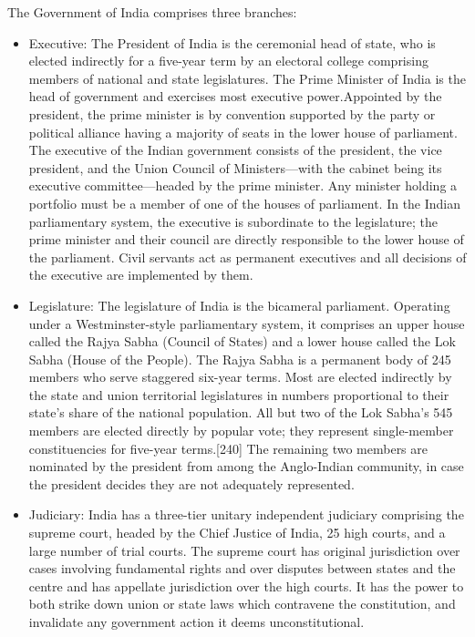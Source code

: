 \documentclass[12pt,a4paper]{article}
\begin{document}
The Government of India comprises three branches:
\begin{itemize}
	\item Executive: The President of India is the ceremonial head of state, who is elected indirectly for a five-year term by an electoral college comprising members of national and state legislatures. The Prime Minister of India is the head of government and exercises most executive power.Appointed by the president, the prime minister is by convention supported by the party or political alliance having a majority of seats in the lower house of parliament. The executive of the Indian government consists of the president, the vice president, and the Union Council of Ministers—with the cabinet being its executive committee—headed by the prime minister. Any minister holding a portfolio must be a member of one of the houses of parliament. In the Indian parliamentary system, the executive is subordinate to the legislature; the prime minister and their council are directly responsible to the lower house of the parliament. Civil servants act as permanent executives and all decisions of the executive are implemented by them.
	\item Legislature: The legislature of India is the bicameral parliament. Operating under a Westminster-style parliamentary system, it comprises an upper house called the Rajya Sabha (Council of States) and a lower house called the Lok Sabha (House of the People). The Rajya Sabha is a permanent body of 245 members who serve staggered six-year terms. Most are elected indirectly by the state and union territorial legislatures in numbers proportional to their state's share of the national population. All but two of the Lok Sabha's 545 members are elected directly by popular vote; they represent single-member constituencies for five-year terms.[240] The remaining two members are nominated by the president from among the Anglo-Indian community, in case the president decides they are not adequately represented.
	\item Judiciary: India has a three-tier unitary independent judiciary comprising the supreme court, headed by the Chief Justice of India, 25 high courts, and a large number of trial courts. The supreme court has original jurisdiction over cases involving fundamental rights and over disputes between states and the centre and has appellate jurisdiction over the high courts. It has the power to both strike down union or state laws which contravene the constitution, and invalidate any government action it deems unconstitutional.
\end{itemize}
\end{document}
